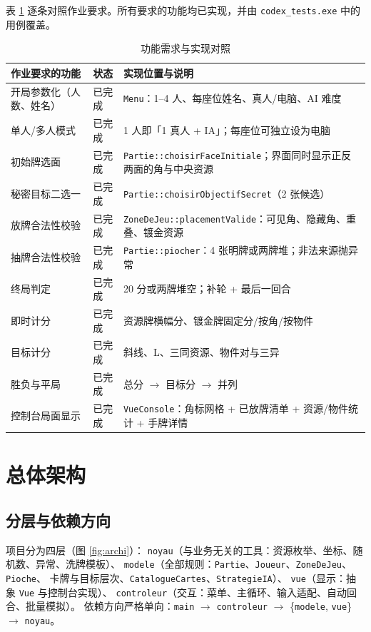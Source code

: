 \documentclass[11pt,a4paper]{ctexart}
\newcommand{\cl}[1]{\texttt{#1}}
\begin{document}
表 \ref{tab:fonctions} 逐条对照作业要求。所有要求的功能均已实现，并由
\cl{codex\_tests.exe} 中的用例覆盖。

\begin{table}[h]
\centering
\small
\begin{tabular}{p{5.4cm}p{1.5cm}p{7.6cm}}
\toprule
作业要求的功能 & 状态 & 实现位置与说明 \\
\midrule
开局参数化（人数、姓名） & 已完成 & \cl{Menu}：1--4 人、每座位姓名、真人/电脑、AI 难度 \\
单人/多人模式 & 已完成 & 1 人即「1 真人 + IA」；每座位可独立设为电脑 \\
初始牌选面 & 已完成 & \cl{Partie::choisirFaceInitiale}；界面同时显示正反两面的角与中央资源 \\
秘密目标二选一 & 已完成 & \cl{Partie::choisirObjectifSecret}（2 张候选） \\
放牌合法性校验 & 已完成 & \cl{ZoneDeJeu::placementValide}：可见角、隐藏角、重叠、镀金资源 \\
抽牌合法性校验 & 已完成 & \cl{Partie::piocher}：4 张明牌或两牌堆；非法来源抛异常 \\
终局判定 & 已完成 & 20 分或两牌堆空；补轮 + 最后一回合 \\
即时计分 & 已完成 & 资源牌横幅分、镀金牌固定分/按角/按物件 \\
目标计分 & 已完成 & 斜线、L、三同资源、物件对与三异 \\
胜负与平局 & 已完成 & 总分 $\rightarrow$ 目标分 $\rightarrow$ 并列 \\
控制台局面显示 & 已完成 & \cl{VueConsole}：角标网格 + 已放牌清单 + 资源/物件统计 + 手牌详情 \\
\bottomrule
\end{tabular}
\caption{功能需求与实现对照}
\label{tab:fonctions}
\end{table}

\section{总体架构}

\subsection{分层与依赖方向}
项目分为四层（图 \ref{fig:archi}）：
\cl{noyau}（与业务无关的工具：资源枚举、坐标、随机数、异常、洗牌模板）、
\cl{modele}（全部规则：\cl{Partie}、\cl{Joueur}、\cl{ZoneDeJeu}、\cl{Pioche}、
卡牌与目标层次、\cl{CatalogueCartes}、\cl{StrategieIA}）、
\cl{vue}（显示：抽象 \cl{Vue} 与控制台实现）、
\cl{controleur}（交互：菜单、主循环、输入适配、自动回合、批量模拟）。
依赖方向严格单向：\cl{main} $\rightarrow$ \cl{controleur} $\rightarrow$
\{\cl{modele}, \cl{vue}\} $\rightarrow$ \cl{noyau}。
\end{document}
